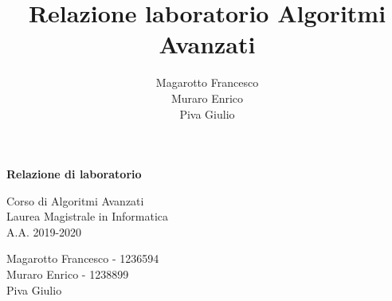 \documentclass[a4paper]{article}
\title{Relazione laboratorio Algoritmi Avanzati}
\author{Magarotto Francesco\\Muraro Enrico\\Piva Giulio}
\begin{document}
\begin{titlepage}
  \vspace*{5cm}
  \begin{center}
    \Large\bfseries
    Relazione di laboratorio
  \end{center}
  \begin{center}
    \large
    Corso di Algoritmi Avanzati\\
    Laurea Magistrale in Informatica\\A.A. 2019-2020
  \end{center}
  \vspace{4cm plus 1fill}
  \begin{flushleft}
    \large
    Magarotto Francesco - 1236594\\Muraro Enrico - 1238899 \\Piva Giulio
  \end{flushleft}
\end{titlepage}
\newpage



\newpage

\end{document}
